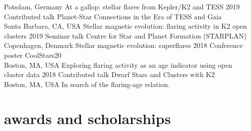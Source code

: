 \documentclass[]{k-cv} %
\begin{document}
\begin{entrylist}
{Potsdam, Germany}
{At a gallop: stellar flares from Kepler/K2 and TESS}
\entry
{2019}
{Contributed talk}
{Planet-Star Connections in the Era of TESS and Gaia\vspace{-.1cm}\\\null\hfill Santa Barbara, CA, USA}
{Stellar magnetic evolution: flaring activity in K2 open clusters}
\entry
{2019}
{Seminar talk}
{Centre for Star and Planet Formation (STARPLAN)\vspace{-.1cm}\\\null\hfill Copenhagen, Denmark}
{Stellar magnetic evolution: superflares}
\entry
{2018}
{Conference poster}
{CoolStars20\vspace{-.1cm}\\\null\hfill Boston, MA, USA}
{Exploring flaring activity as an age indicator using open cluster data}
\entry
{2018}
{Contributed talk}
{Dwarf Stars and Clusters with K2\vspace{-.1cm}\\\null\hfill Boston, MA, USA}
{In search of the flaring-age relation.}
\end{entrylist}


%

\newpage

\section{awards and scholarships}
\end{document}
